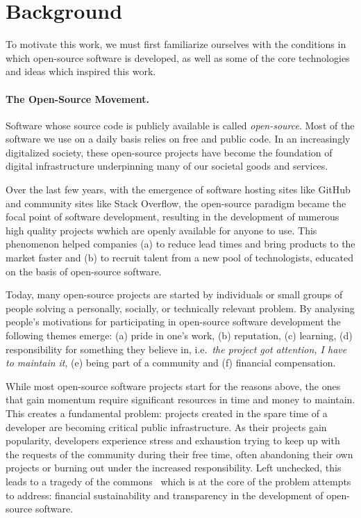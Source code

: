 \section{Background}

To motivate this work, we must first familiarize ourselves with the conditions
in which open-source software is developed, as well as some of the core
technologies and ideas which inspired this work.

\paragraph{The Open-Source Movement.} Software whose source code is publicly
available is called \emph{open-source}. Most of the software we use on a daily
basis relies on free and public code. In an increasingly digitalized society,
these open-source projects have become the foundation of digital infrastructure
underpinning many of our societal goods and services.

Over the last few years, with the emergence of software hosting sites like
GitHub and community sites like Stack Overflow, the open-source paradigm became
the focal point of software development, resulting in the development of
numerous high quality projects wwhich are openly available for anyone to use.
This phenomenon helped companies (a) to reduce lead times and bring products to
the market faster and (b) to recruit talent from a new pool of technologists,
educated on the basis of open-source software.

Today, many open-source projects are started by individuals or small groups of
people solving a personally, socially, or technically relevant problem. By
analysing people's motivations for participating in open-source software
development the following themes emerge: (a) pride in one's work, (b)
reputation, (c) learning, (d) responsibility for something they believe in,
i.e.\ \emph{the project got attention, I have to maintain it}, (e) being part
of a community and (f) financial compensation.

While most open-source software projects start for the reasons above, the ones
that gain momentum require significant resources in time and money to maintain.
This creates a fundamental problem: projects created in the spare time of a
developer are becoming critical public infrastructure. As their projects
gain popularity, developers experience stress and exhaustion trying to keep up
with the requests of the community during their free time, often abandoning
their own projects or burning out under the increased responsibility. Left
unchecked, this leads to a tragedy of the commons~\cite{tragedy-commons} which
is at the core of the problem \oscoin{} attempts to address: financial
sustainability and transparency in the development of open-source software.

